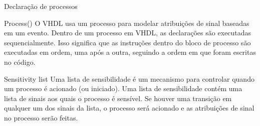 \documentclass[aspectratio=169]{beamer}
\begin{document}
\begin{frame}{Declaração de processos}
	\justifying
	
	
	\begin{block}{Process()}
	O VHDL usa um processo para modelar atribuições de sinal baseadas em um evento. Dentro de um processo em VHDL, as declarações são executadas sequencialmente. Isso significa que as instruções dentro do bloco de processo são executadas em ordem, uma após a outra, seguindo a ordem em que foram escritas no código.
	\end{block}
	
	
	\begin{block}{Sensitivity list}
	Uma lista de sensibilidade é um mecanismo para controlar quando um processo é acionado (ou iniciado). Uma lista de sensibilidade contém uma lista de sinais aos quais o processo é sensível. Se houver uma transição em qualquer um dos sinais da lista, o processo será acionado e as atribuições de sinal no processo serão feitas. 
	\end{block}	
	
	
%		
%		
%	
	
\end{frame}
\end{document}
